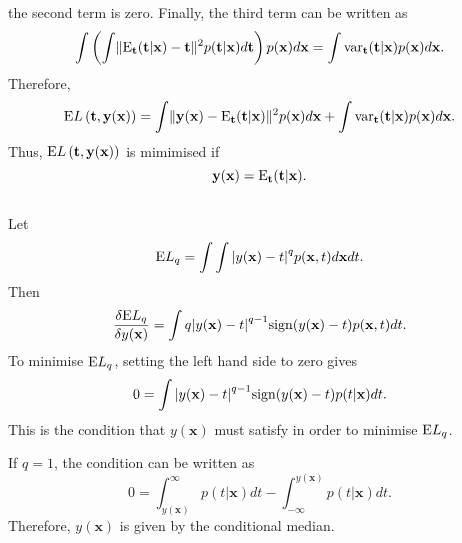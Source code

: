 %
the second term is zero.
Finally, the third term can be written as
%
\begin{equation}
\int \left( \int \lVert {\rm E}_\mathbf{t} (\mathbf{t} | \mathbf{x}) - \mathbf{t} \rVert ^ 2 p(\mathbf{t} | \mathbf{x}) d\mathbf{t} \right) p(\mathbf{x}) d\mathbf{x} = \int {\rm var}_{\mathbf{t}} (\mathbf{t} | \mathbf{x}) p(\mathbf{x}) d\mathbf{x}.
\end{equation}
%
Therefore,
%
\begin{equation}
{\rm E} L\left( \mathbf{t}, \mathbf{y} (\mathbf{x}) \right) = \int \lVert \mathbf{y}(\mathbf{x}) - {\rm E}_\mathbf{t} (\mathbf{t} | \mathbf{x}) \rVert ^ 2 p(\mathbf{x}) d\mathbf{x} + \int {\rm var}_{\mathbf{t}} (\mathbf{t} | \mathbf{x}) p(\mathbf{x}) d\mathbf{x}.
\end{equation}
%
Thus, ${\rm E} L\left( \mathbf{t}, \mathbf{y} (\mathbf{x}) \right)$ is mimimised if
%
\begin{equation}
\mathbf{y} (\mathbf{x}) = {\rm E}_\mathbf{t} (\mathbf{t} | \mathbf{x}).
\end{equation}


\subsection{}
Let
%
\begin{equation}
{\rm E} L_q = \int \int \abs{y(\mathbf{x}) - t} ^ q p(\mathbf{x}, t) d\mathbf{x} dt.
\end{equation}
%
Then
%
\begin{equation}
\frac{\delta {\rm E} L_q}{\delta y (\mathbf{x})} = \int q \abs{y(\mathbf{x}) - t} ^ {q - 1} {\rm sign} (y(\mathbf{x}) - t) p(\mathbf{x}, t) dt.
\end{equation}
%
To minimise ${\rm E} L_q$, setting the left hand side to zero gives
%
\begin{equation}
0 = \int \abs{y(\mathbf{x}) - t} ^ {q - 1} {\rm sign} (y(\mathbf{x}) - t) p(t | \mathbf{x}) dt.
\end{equation}
%
This is the condition that $y(\mathbf{x})$ must satisfy in order to minimise ${\rm E} L_q$.

If $q = 1$, the condition can be written as
%
\begin{equation}
0 = \int_{y(\mathbf{x})}^{\infty} p(t | \mathbf{x}) dt - \int_{- \infty}^{y(\mathbf{x})} p(t | \mathbf{x}) dt.
\end{equation}
%
Therefore, $y(\mathbf{x})$ is given by the conditional median.



























